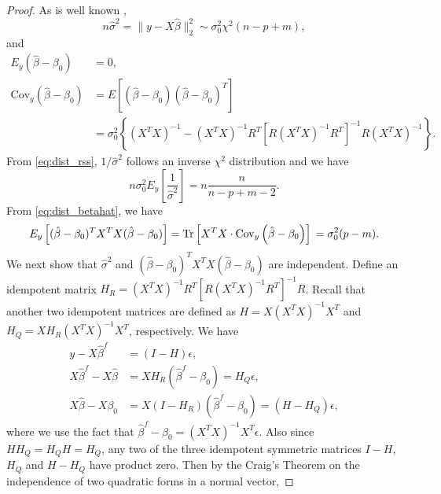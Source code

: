 \begin{proof}
As is well known ,
\begin{equation}
  n\hat\sigma^2 = \lVert y-X\hat{\beta} \rVert_2^2 \sim \sigma_0^2 \chi^2(n-p+m),
  \label{eq:dist_rss}
\end{equation}
and 
\begin{equation}
\begin{aligned}
E_y\left(\hat{\beta} - \beta_0 \right) &= 0,\\
\text{Cov}_y\left(\hat{\beta} - \beta_0 \right) &= E\left[\left(\hat{\beta} - \beta_0 \right)\left(\hat{\beta} - \beta_0 \right)^T \right]\\
&= \sigma_0^2 \left\{ (X^T X)^{-1} - (X^T X)^{-1}R^T\left[ R(X^T X)^{-1}R^T \right]^{-1} R(X^T X)^{-1} \right\}.
\end{aligned}
\label{eq:dist_betahat}
\end{equation}
From \eqref{eq:dist_rss}, $1/\hat{\sigma}^2$ follows an inverse $\chi^2$ distribution and we have
\begin{equation*}
n \sigma_0^2 E_y\left[ \frac{1}{\hat{\sigma}^2} \right] = n\frac{n}{n-p+m-2}.
\end{equation*}
From \eqref{eq:dist_betahat}, we have
\begin{equation*}
E_y  \left [ (\hat \beta-\beta_0)^T X^T X (\hat \beta-\beta_0) \right ] 
= \text{Tr} \left[ X^T X \cdot \text{Cov}_y \left( \hat{\beta} - \beta_0 \right) \right] \\
= \sigma_0^2 (p-m).
\end{equation*}
We next show that $\hat{\sigma}^2$ and $(\hat \beta-\beta_0)^T X^T X (\hat \beta-\beta_0)$ are independent. Define an idempotent matrix $H_R=(X^T X)^{-1} R^T \left[ R (X^T X)^{-1} R^T \right]^{-1} R$. Recall that another two idempotent matrices are defined as $H=X(X^T X)^{-1} X^T$ and $H_Q = X H_R (X^T X)^{-1} X^T$, respectively. We have
\begin{equation*}
\begin{aligned}
y-X\hat{\beta}^f &= (I-H)\epsilon,\\
X\hat{\beta}^f - X\hat{\beta} &= XH_R(\hat{\beta}^f - \beta_0) =H_Q \epsilon,\\
X\hat{\beta} - X\beta_0 &= X(I-H_R)(\hat{\beta}^f - \beta_0) = (H-H_Q) \epsilon,
\end{aligned}
\end{equation*}
where we use the fact that $\hat{\beta}^f - \beta_0 = (X^T X)^{-1}X^T \epsilon$. Also since $HH_Q=H_QH=H_Q$, any two of the three idempotent symmetric matrices $I-H$, $H_Q$ and $H-H_Q$ have product zero. Then by the Craig's Theorem  on the independence of two quadratic forms in a normal vector, 

\end{proof}
